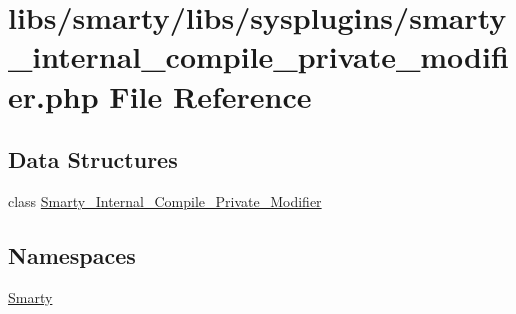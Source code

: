 \hypertarget{smarty__internal__compile__private__modifier_8php}{}\section{libs/smarty/libs/sysplugins/smarty\+\_\+internal\+\_\+compile\+\_\+private\+\_\+modifier.php File Reference}
\label{smarty__internal__compile__private__modifier_8php}
\subsection*{Data Structures}
\begin{DoxyCompactItemize}
\item 
class \hyperlink{class_smarty___internal___compile___private___modifier}{Smarty\+\_\+\+Internal\+\_\+\+Compile\+\_\+\+Private\+\_\+\+Modifier}
\end{DoxyCompactItemize}
\subsection*{Namespaces}
\begin{DoxyCompactItemize}
\item 
 \hyperlink{namespace_smarty}{Smarty}
\end{DoxyCompactItemize}
